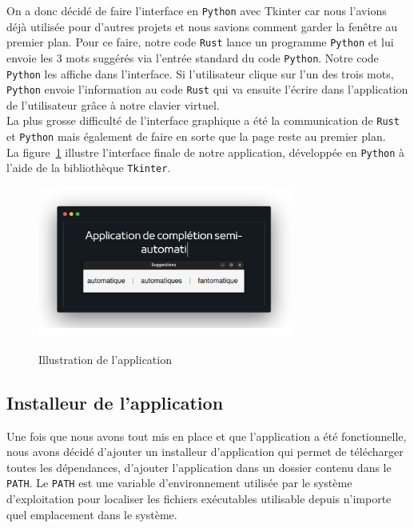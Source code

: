 \documentclass[a4paper, 11pt]{report}
\newcommand{\langage}[1]{\texttt{#1}}
\begin{document}
{On a donc décidé de faire l'interface en \langage{Python} avec Tkinter car nous l'avions déjà utilisée pour d'autres projets et nous savions comment garder la fenêtre au premier plan. Pour ce faire, notre code \langage{Rust} lance un programme \langage{Python} et lui envoie les 3 mots suggérés via l'entrée standard du code \langage{Python}. Notre code \langage{Python} les affiche dans l'interface. Si l'utilisateur clique sur l'un des trois mots, \langage{Python} envoie l'information au code \langage{Rust} qui va ensuite l'écrire dans l'application de l'utilisateur grâce à notre clavier virtuel.\\

La plus grosse difficulté de l'interface graphique a été la communication de \langage{Rust} et \langage{Python} mais également de faire en sorte que la page reste au premier plan.\\

La figure~\ref{fig:interface} illustre l’interface finale de notre application, développée en \langage{Python} à l’aide de la bibliothèque \langage{Tkinter}.

\begin{figure}[H]
	\begin{center}
		{\includegraphics[width=0.75\textwidth]{images/illustration.png}}
	\end{center}
	\caption{Illustration de l'application}
	\label{fig:interface}
\end{figure}

\subsection{Installeur de l'application}

Une fois que nous avons tout mis en place et que l'application a été fonctionnelle, nous avons décidé d'ajouter un installeur d'application qui permet de télécharger toutes les dépendances, d'ajouter l'application dans un dossier contenu dans le \langage{PATH}. Le \langage{PATH} est une variable d'environnement utilisée par le système d'exploitation pour localiser les fichiers exécutables utilisable depuis n'importe quel emplacement dans le système.\\

}
\end{document}
